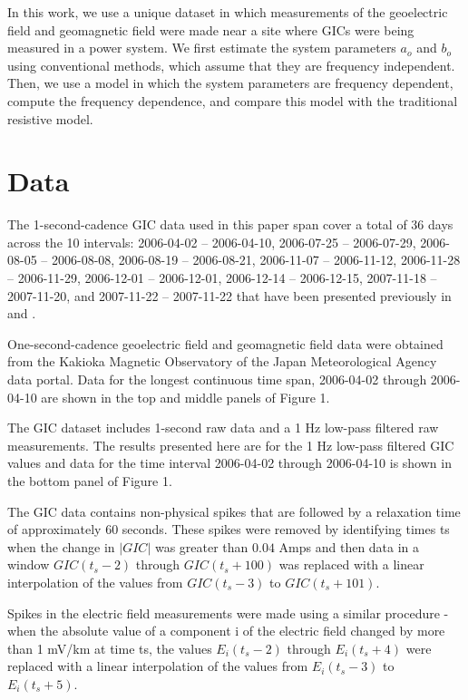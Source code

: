 \documentclass[draft,linenumbers]{agujournal2018}
\begin{document}
In this work, we use a unique dataset in which measurements of the geoelectric field and geomagnetic field were made near a site where GICs were being measured in a power system.  We first estimate the system parameters $a_o$ and $b_o$ using conventional methods, which assume that they are frequency independent.  Then, we use a model in which the system parameters are frequency dependent, compute the frequency dependence, and compare this model with the traditional resistive model. 

\section{Data}

The 1-second-cadence GIC data used in this paper span cover a total of 36 days across the 10 intervals: 2006-04-02 -- 2006-04-10, 2006-07-25 -- 2006-07-29, 2006-08-05 -- 2006-08-08, 2006-08-19 -- 2006-08-21, 2006-11-07 -- 2006-11-12, 2006-11-28 -- 2006-11-29, 2006-12-01 -- 2006-12-01, 2006-12-14 -- 2006-12-15, 2007-11-18 -- 2007-11-20, and 2007-11-22 -- 2007-11-22 that have been presented previously in \citet{Watari2009} and \cite{Watari2015}.

One-second-cadence geoelectric field and geomagnetic field data were obtained from the Kakioka Magnetic Observatory of the Japan Meteorological Agency data portal. Data for the longest continuous time span, 2006-04-02 through 2006-04-10 are shown in the top and middle panels of Figure 1.

The GIC dataset includes 1-second raw data and a 1 Hz low-pass filtered raw measurements.  The results presented here are for the 1 Hz low-pass filtered GIC values and data for the time interval 2006-04-02 through 2006-04-10 is shown in the bottom panel of Figure 1.

The GIC data contains non-physical spikes that are followed by a relaxation time of approximately 60 seconds. These spikes were removed by identifying times ts when the change in $|GIC|$ was greater than $0.04$ Amps and then data in a window $GIC(t_s-2)$ through $GIC(t_s+100)$ was replaced with a linear interpolation of the values from $GIC(t_s-3)$ to $GIC(t_s + 101)$.

Spikes in the electric field measurements were made using a similar procedure - when the absolute value of a component i of the electric field changed by more than 1 mV/km at time ts, the values $E_i(t_s-2)$ through $E_i(t_s+4)$ were replaced with a linear interpolation of the values from $E_i(t_s-3)$ to $E_i(t_s + 5)$.
\end{document}

